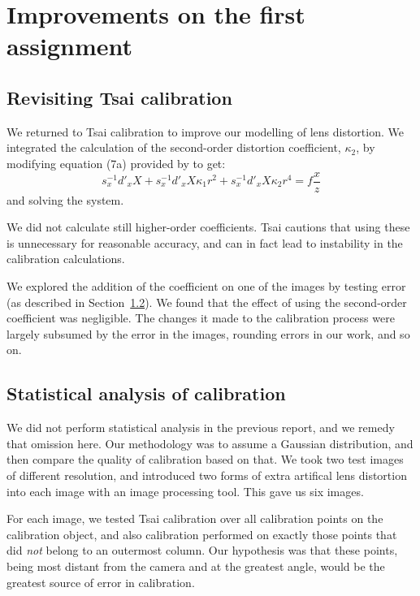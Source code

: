 
\section{Improvements on the first assignment}
\label{sec:improvements}

\subsection{Revisiting Tsai calibration}

%

We returned to Tsai calibration to improve our modelling of lens distortion. We integrated the calculation of the second-order distortion coefficient, $\kappa_{2}$, by modifying equation (7a) provided by \citet{TSAI} to get:
\[
	s_{x}^{-1}d'_{x}X + s_{x}^{-1}d'_{x}X\kappa_{1}r^{2} + s_{x}^{-1}d'_{x}X\kappa_{2}r^{4} = f\frac{x}{z}
\]
and solving the system.

We did not calculate still higher-order coefficients. Tsai cautions that using these is unnecessary for reasonable accuracy, and can in fact lead to instability in the calibration calculations. \cite{TSAI}

We explored the addition of the coefficient on one of the images by testing error (as described in Section~\ref{sec:statcalibration}). We found that the effect of using the second-order coefficient was negligible. The changes it made to the calibration process were largely subsumed by the error in the images, rounding errors in our work, and so on.

%

\subsection{Statistical analysis of calibration}
\label{sec:statcalibration}

We did not perform statistical analysis in the previous report, and we remedy that omission here. Our methodology was to assume a Gaussian distribution, and then compare the quality of calibration based on that. We took two test images of different resolution, and introduced two forms of extra artifical lens distortion into each image with an image processing tool. This gave us six images.

For each image, we tested Tsai calibration over all calibration points on the calibration object, and also calibration performed on exactly those points that did \emph{not} belong to an outermost column. Our hypothesis was that these points, being most distant from the camera and at the greatest angle, would be the greatest source of error in calibration.

